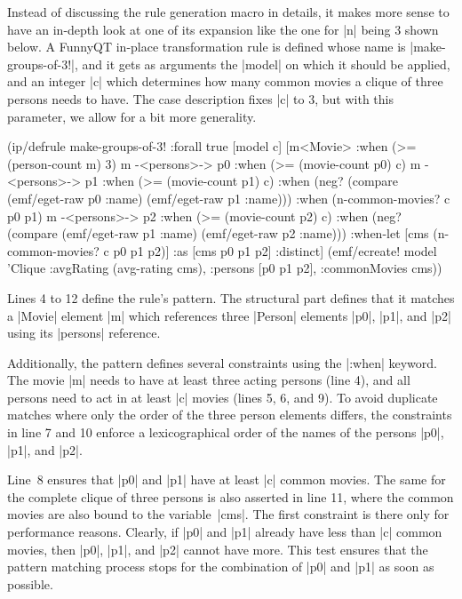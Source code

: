 \documentclass[submission]{eptcs}
\newcommand{\code}{\clojureinline}
\begin{document}
Instead of discussing the rule generation macro in details, it makes more sense
to have an in-depth look at one of its expansion like the one for \code|n|
being 3 shown below.  A FunnyQT in-place transformation rule is defined whose
name is \code|make-groups-of-3!|, and it gets as arguments the \code|model| on
which it should be applied, and an integer \code|c| which determines how many
common movies a clique of three persons needs to have.  The case description
fixes \code|c| to 3, but with this parameter, we allow for a bit more
generality.

\begin{clojurecode}
(ip/defrule make-groups-of-3!
  {:forall true}
  [model c]
  [m<Movie>           :when (>= (person-count m) 3)
   m -<persons>-> p0  :when (>= (movie-count p0) c)
   m -<persons>-> p1  :when (>= (movie-count p1) c)
                      :when (neg? (compare (emf/eget-raw p0 :name) (emf/eget-raw p1 :name)))
                      :when (n-common-movies? c p0 p1)
   m -<persons>-> p2  :when (>= (movie-count p2) c)
                      :when (neg? (compare (emf/eget-raw p1 :name) (emf/eget-raw p2 :name)))
   :when-let [cms (n-common-movies? c p0 p1 p2)]
   :as [cms p0 p1 p2] :distinct]
  (emf/ecreate! model 'Clique {:avgRating (avg-rating cms), :persons [p0 p1 p2], :commonMovies cms}))
\end{clojurecode}

Lines 4 to 12 define the rule's pattern.  The structural part defines that it
matches a \code|Movie| element \code|m| which references three \code|Person|
elements \code|p0|, \code|p1|, and \code|p2| using its \code|persons|
reference.

Additionally, the pattern defines several constraints using the \code|:when|
keyword.  The movie \code|m| needs to have at least three acting persons (line
4), and all persons need to act in at least \code|c| movies (lines 5, 6, and
9).  To avoid duplicate matches where only the order of the three person
elements differs, the constraints in line 7 and 10 enforce a lexicographical
order of the names of the persons \code|p0|, \code|p1|, and \code|p2|.

Line~8 ensures that \code|p0| and \code|p1| have at least \code|c| common
movies.  The same for the complete clique of three persons is also asserted in
line 11, where the common movies are also bound to the variable~\code|cms|.
The first constraint is there only for performance reasons.  Clearly, if
\code|p0| and \code|p1| already have less than \code|c| common movies, then
\code|p0|, \code|p1|, and \code|p2| cannot have more.  This test ensures that
the pattern matching process stops for the combination of \code|p0| and
\code|p1| as soon as possible.
\end{document}
